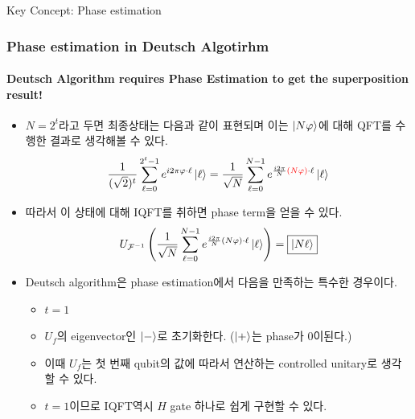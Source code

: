 \documentclass[9pt]{beamer}
\begin{document}
\begin{section}{Key Concept: Phase estimation}
        \begin{frame}
            \frametitle{Phase estimation in Deutsch Algotirhm}
            \framesubtitle{Deutsch Algorithm requires Phase Estimation to get the superposition result!}
            \begin{itemize}
                \item $N=2^t$라고 두면 최종상태는 다음과 같이 표현되며 이는 $\ket{N \varphi}$에 대해 QFT를 수행한 결과로 생각해볼 수 있다.
                $$ \frac{1}{(\sqrt {2})^t} \sum^{2^t-1}_{\ell=0} e^{i2\pi \varphi \cdot \ell} \ket{\ell} = \frac{1}{\sqrt N} \sum^{N-1}_{\ell=0} e^{\frac{i2\pi}{N} {\color{red}(N\varphi)} \cdot \ell} \ket \ell$$ 
                \item 따라서 이 상태에 대해 IQFT를 취하면 phase term을 얻을 수 있다.
                $$U_{\mathcal F^{-1}}\left( \frac{1}{\sqrt N} \sum^{N-1}_{\ell=0} e^{\frac{i2\pi}{N} {(N\varphi)} \cdot \ell} \ket \ell \right) = \boxed{\ket{N\ell}}$$
                \item Deutsch algorithm은 phase estimation에서 다음을 만족하는 특수한 경우이다.
                \begin{itemize}
                    \item $t=1$
                    \item $U_f$의 eigenvector인 $\ket -$로 초기화한다. ($\ket +$는 phase가 0이된다.)
                    \item 이때 $U_f$는 첫 번째 qubit의 값에 따라서 연산하는 controlled unitary로 생각할 수 있다.
                    \item $t=1$이므로 IQFT역시 $H$ gate 하나로 쉽게 구현할 수 있다.
                \end{itemize}
                    
            \end{itemize}

        \end{frame}
    \end{section}
\end{document}
